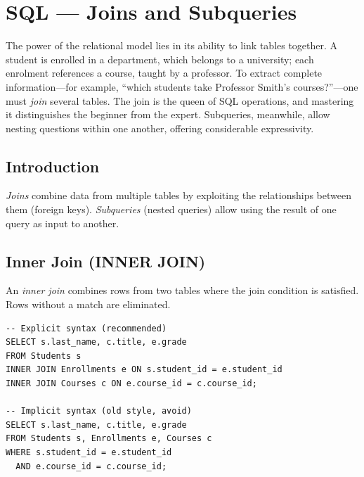 \chapter{SQL --- Joins and Subqueries}
\label{ch:joins}

The power of the relational model lies in its ability to link tables together. A student is enrolled in a department, which belongs to a university; each enrolment references a course, taught by a professor. To extract complete information---for example, ``which students take Professor Smith's courses?''---one must \emph{join} several tables. The join is the queen of SQL operations, and mastering it distinguishes the beginner from the expert. Subqueries, meanwhile, allow nesting questions within one another, offering considerable expressivity.

\section{Introduction}

\emph{Joins} combine data from multiple tables by exploiting the relationships
between them (foreign keys). \emph{Subqueries} (nested queries) allow using
the result of one query as input to another.

\section{Inner Join (INNER JOIN)}

\begin{definition}
An \emph{inner join} combines rows from two tables where the join condition
is satisfied. Rows without a match are eliminated.
\end{definition}

\begin{codeblock}[title=\textbf{Equivalent Inner Join Syntaxes}]
\begin{verbatim}
-- Explicit syntax (recommended)
SELECT s.last_name, c.title, e.grade
FROM Students s
INNER JOIN Enrollments e ON s.student_id = e.student_id
INNER JOIN Courses c ON e.course_id = c.course_id;

-- Implicit syntax (old style, avoid)
SELECT s.last_name, c.title, e.grade
FROM Students s, Enrollments e, Courses c
WHERE s.student_id = e.student_id
  AND e.course_id = c.course_id;
\end{verbatim}
\end{codeblock}

